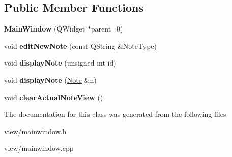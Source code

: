 \subsection*{Public Member Functions}
\begin{DoxyCompactItemize}
\item 
\hypertarget{class_main_window_a8b244be8b7b7db1b08de2a2acb9409db}{{\bfseries Main\-Window} (Q\-Widget $\ast$parent=0)}\label{class_main_window_a8b244be8b7b7db1b08de2a2acb9409db}

\item 
\hypertarget{class_main_window_a699fd60aefd7e7e55ae7a7ada9223cea}{void {\bfseries edit\-New\-Note} (const Q\-String \&Note\-Type)}\label{class_main_window_a699fd60aefd7e7e55ae7a7ada9223cea}

\item 
\hypertarget{class_main_window_af1723fd9d338225faefa019817f4d4ba}{void {\bfseries display\-Note} (unsigned int id)}\label{class_main_window_af1723fd9d338225faefa019817f4d4ba}

\item 
\hypertarget{class_main_window_a3a04dacc213651abc6f6fbbbe4c9272a}{void {\bfseries display\-Note} (\hyperlink{class_note}{Note} \&n)}\label{class_main_window_a3a04dacc213651abc6f6fbbbe4c9272a}

\item 
\hypertarget{class_main_window_abdc55dc240e320da3fc6a83ad0c07c2d}{void {\bfseries clear\-Actual\-Note\-View} ()}\label{class_main_window_abdc55dc240e320da3fc6a83ad0c07c2d}

\end{DoxyCompactItemize}


The documentation for this class was generated from the following files\-:\begin{DoxyCompactItemize}
\item 
view/mainwindow.\-h\item 
view/mainwindow.\-cpp\end{DoxyCompactItemize}
